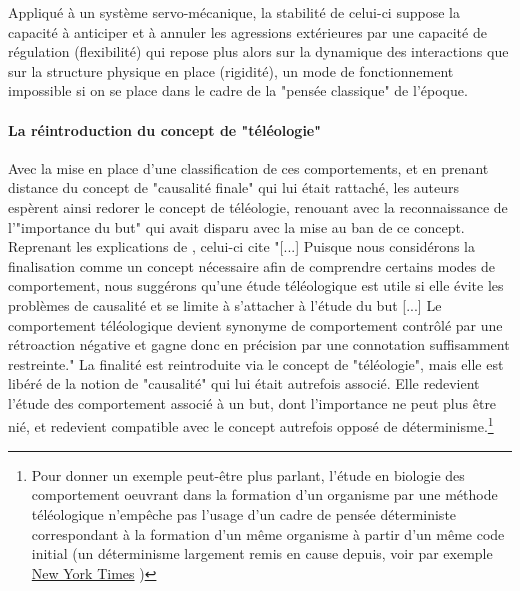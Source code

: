 {Appliqué à un système servo-mécanique, la stabilité de celui-ci suppose la capacité à anticiper et à annuler les agressions extérieures par une capacité de régulation (flexibilité) qui repose plus alors sur la dynamique des interactions que sur la structure physique en place (rigidité), un mode de fonctionnement impossible si on se place dans le cadre de la "pensée classique" de l'époque. 


\paragraph{La réintroduction du concept de "téléologie"}

Avec la mise en place d'une classification de ces comportements, et en prenant distance du concept de "causalité finale" qui lui était rattaché, les auteurs espèrent ainsi redorer le concept de téléologie, renouant avec la reconnaissance de l'"importance du but" qui avait disparu avec la mise au ban de ce concept. Reprenant les explications de \autocite[776]{Pouvreau2013}, celui-ci cite \autocite[23-24]{Rosenblueth1943} "[...] Puisque nous considérons la finalisation comme un concept nécessaire afin de comprendre certains modes de comportement, nous suggérons qu'une étude téléologique est utile si elle évite les problèmes de causalité et se limite à s'attacher à l'étude du but [...] Le comportement téléologique devient synonyme de comportement contrôlé par une rétroaction négative et gagne donc en précision par une connotation suffisamment restreinte." La finalité est reintroduite via le concept de "téléologie", mais elle est libéré de la notion de "causalité" qui lui était autrefois associé. Elle redevient l'étude des comportement associé à un but, dont l'importance ne peut plus être nié, et redevient compatible avec le concept autrefois opposé de déterminisme.\footnote{Pour donner un exemple peut-être plus parlant, l'étude en biologie des comportement oeuvrant dans la formation d'un organisme par une méthode téléologique n'empêche pas l'usage d'un cadre de pensée déterministe  correspondant à la formation d'un même organisme à partir d'un même code initial (un déterminisme largement remis en cause depuis, voir par exemple \href{http://www.nytimes.com/2014/01/21/science/seeing-x-chromosomes-in-a-new-light.html?ref=science&_r=0}{New York Times} )}

}
